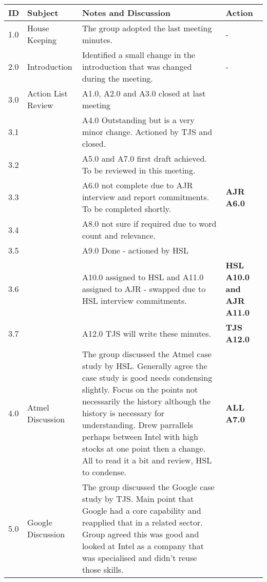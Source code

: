 \begin{center}
\begin{longtable}{| p{} |>{\raggedright\arraybackslash}p{} | p{} |>{\raggedright\arraybackslash}p{}|} \hline
\textbf{ID} & \textbf{Subject} & \textbf{Notes and Discussion} & \textbf{Action} \\ \hline
\endhead
1.0	&	House Keeping	&	The group adopted the last meeting minutes.													&	- \\ \hline
2.0	&	Introduction		&	Identified a small change in the introduction that was changed during the meeting.							&	- \\ \hline
3.0	&	Action List Review	&	A1.0, A2.0 and A3.0 closed at last meeting													 & 	   \\
3.1	&				&	A4.0 Outstanding but is a very minor change. Actioned by TJS and closed.								 & 	   \\
3.2	&				&	A5.0 and A7.0 first draft achieved. To be reviewed in this meeting.									 & 	   \\
3.3	&				&	A6.0 not complete due to AJR interview and report commitments. To be completed shortly.						 & \textbf{AJR A6.0} 	   \\
3.4	&				&	A8.0 not sure if required due to word count and relevance.											 & 	   \\
3.5	&				&	A9.0 Done - actioned by HSL															 & 	   \\
3.6	&				&	A10.0 assigned to HSL and A11.0 assigned to AJR - swapped due to HSL interview commitments.					 &  \textbf{HSL A10.0 and AJR A11.0} \\
3.7	&				&	A12.0 TJS will write these minutes.														 &  \textbf{TJS A12.0} \\ \hline
4.0	&	Atmel Discussion	&	The group discussed the Atmel case study by HSL. 
						Generally agree the case study is good needs condensing slightly. 
						Focus on the points not necessarily the history although the history is necessary for understanding. 
						Drew parrallels perhaps between Intel with high stocks at one point then a change. 
						All to read it a bit and review, HSL to condense.												&  \textbf{ALL A7.0} \\ \hline
5.0	&	Google Discussion	&	The group discussed the Google case study by TJS. 
						Main point that Google had a core capability and reapplied that in a related sector.
						Group agreed this was good and looked at Intel as a company that was specialised and didn't reuse those skills.

\end{longtable}
\end{center}

